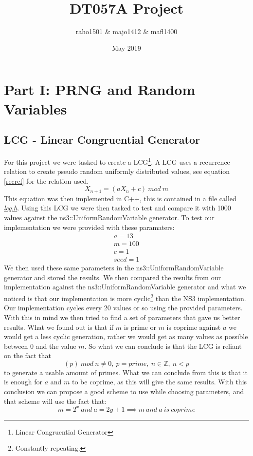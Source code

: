 \documentclass{article}
\title{DT057A Project}
\author{raho1501 \& majo1412 \& mafl1400}
\date{May 2019}
\begin{document}
\maketitle

\section{Part I: PRNG and Random Variables} \label{part1}
  \subsection{LCG - Linear Congruential Generator}
    For this project we were tasked to create a LCG\footnote{Linear Congruential Generator}. 
    A LCG uses a recurrence relation to create pseudo random uniformly distributed values, see equation \ref{recrel} for the relation used.
    \begin{equation} \label{recrel}
      X_{n+1} = (aX_{n} + c)\ mod\ m
    \end{equation}
    This equation was then implemented in C++, this is contained in a file called \href{https://github.com/NoRines/simulerings_projekt/blob/master/lcg.h}{\emph{lcg.h}}.
    Using this LCG we were then tasked to test and compare it with 1000 values against the ns3::UniformRandomVariable generator. 
    To test our implementation we were provided with these paramaters:
    \begin{align*}
      a=13 \\
      m=100 \\
      c=1 \\
      seed=1
    \end{align*}
    We then used these same parameters in the ns3::UniformRandomVariable generator and stored the results.
    We then compared the results from our implementation against the ns3::UniformRandomVariable generator and what we noticed is that our implementation is more cyclic\footnote{Constantly repeating.} than the NS3 implementation. 
    Our implementation cycles every 20 values or so using the provided parameters.
    With this in mind we then tried to find a set of parameters that gave us better results.
    What we found out is that if $m$ is prime or $m$ is coprime against $a$ we would get a less cyclic generation, rather we would get as many values as possible between 0 and the value $m$.
    So what we can conclude is that the LCG is reliant on the fact that
    \begin{equation}
      (p)\ mod\ n \neq 0,\ p = prime,\ n \in \mathbb{Z} ,\ n < p
    \end{equation}
    to generate a usable amount of primes.
    What we can conclude from this is that it is enough for $a$ and $m$ to be coprime, as this will give the same results.
    With this conclusion we can propose a good scheme to use while choosing parameters, and that scheme will use the fact that:
    \begin{equation}
      m = 2^{x}\ and\ a = 2y+1 \implies m\ and\ a\ is\ coprime
    \end{equation}
    
\end{document}
